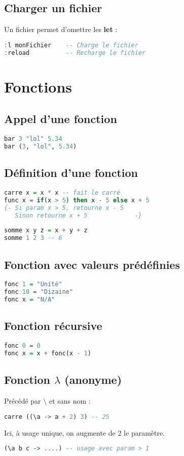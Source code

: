         \subsection{Charger un fichier}
            Un fichier permet d'omettre les \textbf{let} :
            \begin{lstlisting}[language=Haskell]
:l monFichier    -- Charge le fichier
:reload          -- Recharge le fichier
            \end{lstlisting}
            \section{Fonctions}
        \subsection{Appel d'une fonction}
            \begin{lstlisting}[language=Haskell]
bar 3 "lol" 5.34
bar (3, "lol", 5.34)
            \end{lstlisting}
        \subsection{Définition d'une fonction}
            \begin{lstlisting}[language=Haskell]
carre x = x * x -- fait le carré
func x = if(x > 5) then x - 5 else x + 5
{- Si param x > 5, retourne x - 5
   Sinon retourne x + 5             -}
   
somme x y z = x + y + z
somme 1 2 3 -- 6
            \end{lstlisting}
        \subsection{Fonction avec valeurs prédéfinies}
            \begin{lstlisting}[language=Haskell]
fonc 1 = "Unité"
fonc 10 = "Dizaine"
fonc x = "N/A"
            \end{lstlisting}
        \subsection{Fonction récursive}
            \begin{lstlisting}[language=Haskell]
fonc 0 = 0
fonc x = x + fonc(x - 1)
            \end{lstlisting}
        \subsection{Fonction $\lambda$ (anonyme)}
            Précédé par $\setminus$ et sans nom :
            \begin{lstlisting}[language=Haskell]
carre ((\a -> a + 2) 3) -- 25
            \end{lstlisting}
            Ici, à usage unique, on augmente de 2 le paramètre.
            \begin{lstlisting}[language=Haskell]
(\a b c -> ....) -- usage avec param > 1
            \end{lstlisting}
